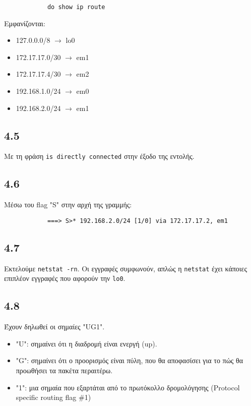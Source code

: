 \documentclass[a4paper, 12pt]{article}
\begin{document}
		\begin{verbatim}
			do show ip route
		\end{verbatim}
		
		Εμφανίζονται:
		
		\begin{itemize}
			\item 127.0.0.0/8 $\rightarrow$ lo0
			\item 172.17.17.0/30 $\rightarrow$ em1
			\item 172.17.17.4/30 $\rightarrow$ em2
			\item 192.168.1.0/24 $\rightarrow$ em0
			\item 192.168.2.0/24 $\rightarrow$ em1
		\end{itemize}

	\subsection*{4.5}
		Με τη φράση \verb|is directly connected| στην έξοδο της εντολής.

	\subsection*{4.6}
		Μέσω του flag "S" στην αρχή της γραμμής:
		
		\begin{verbatim}
			===> S>* 192.168.2.0/24 [1/0] via 172.17.17.2, em1
		\end{verbatim}

	\subsection*{4.7}
		Εκτελούμε \verb|netstat -rn|. Οι εγγραφές συμφωνούν, απλώς η \verb|netstat| έχει κάποιες επιπλέον εγγραφές που αφορούν την \verb|lo0|.

	\subsection*{4.8}
		Έχουν δηλωθεί οι σημαίες "UG1". 
		
		\begin{itemize}
			\item "U": σημαίνει ότι η διαδρομή είναι ενεργή (up).
			\item "G": σημαίνει ότι ο προορισμός είναι πύλη, που θα αποφασίσει για το πώς θα προωθήσει τα πακέτα περαιτέρω.
			\item "1": μια σημαία που εξαρτάται από το πρωτόκολλο δρομολόγησης (Protocol specific routing flag \#1)
		\end{itemize}
		
\end{document}
